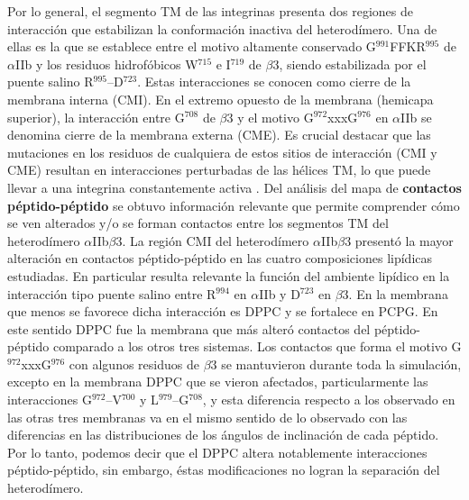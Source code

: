 	Por lo general, el segmento TM de las integrinas presenta dos regiones de interacción que estabilizan la conformación inactiva del heterodímero. Una de ellas es la que se establece entre el motivo altamente conservado G$^{991}$FFKR$^{995}$ de $\alpha$IIb y los residuos hidrofóbicos W$^{715}$ e I$^{719}$ de $\beta$3, siendo estabilizada por el puente salino R$^{995}$--D$^{723}$. Estas interacciones se conocen como cierre de la membrana interna (CMI). En el extremo opuesto de la membrana (hemicapa superior), la interacción entre G$^{708}$ de $\beta$3 y el motivo G$^{972}$xxxG$^{976}$ en $\alpha$IIb se denomina cierre de la membrana externa (CME). Es crucial destacar que las mutaciones en los residuos de cualquiera de estos sitios de interacción (CMI y CME) resultan en interacciones perturbadas de las hélices TM, lo que puede llevar a una integrina constantemente activa \citep{Ye2014, Lau2009}.
	Del análisis del mapa de \textbf{contactos péptido-péptido} se obtuvo información relevante que permite comprender cómo se ven alterados y/o se forman contactos entre los segmentos TM del heterodímero $\alpha$IIb$\beta$3. La región CMI del heterodímero $\alpha$IIb$\beta$3 presentó la mayor alteración en contactos péptido-péptido en las cuatro composiciones lipídicas estudiadas. En particular resulta relevante la función del ambiente lipídico en la interacción tipo puente salino entre R$^{994}$ en $\alpha$IIb y  D$^{723}$ en $\beta$3. En la membrana que menos se favorece dicha interacción es DPPC y se fortalece en PCPG. En este sentido DPPC fue la membrana que más alteró contactos del péptido-péptido comparado a los otros tres sistemas. Los contactos que forma el motivo G$^{972}$xxxG$^{976}$ con algunos residuos de $\beta$3 se mantuvieron durante toda la simulación, excepto en la membrana DPPC que se vieron afectados, particularmente las interacciones G$^{972}$--V$^{700}$ y L$^{979}$--G$^{708}$, y esta diferencia respecto a los observado en las otras tres membranas va en el mismo sentido de lo observado con las diferencias en las distribuciones de los ángulos de inclinación de cada péptido. Por lo tanto, podemos decir que el DPPC altera notablemente interacciones péptido-péptido, sin embargo, éstas modificaciones no logran la separación del heterodímero. 